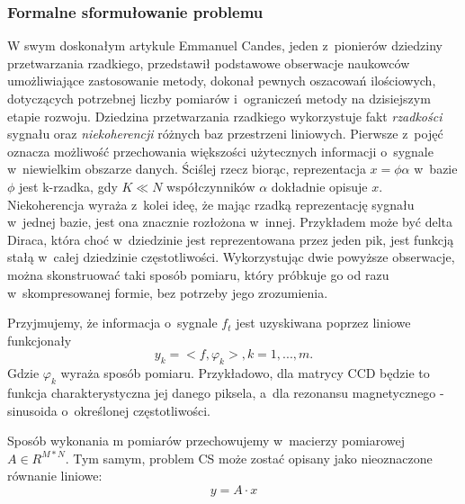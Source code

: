 \subsubsection{Formalne sformułowanie problemu}
W swym doskonałym artykule \cite{CandesIntro} Emmanuel Candes, jeden z~pionierów dziedziny przetwarzania rzadkiego, przedstawił podstawowe obserwacje naukowców umożliwiające zastosowanie metody, dokonał pewnych oszacowań ilościowych, dotyczących potrzebnej liczby pomiarów i~ograniczeń metody na dzisiejszym etapie rozwoju.
Dziedzina przetwarzania rzadkiego wykorzystuje fakt \textit{rzadkości} sygnału oraz \textit{niekoherencji} \cite{Candes2006} różnych baz przestrzeni liniowych. Pierwsze z~pojęć oznacza możliwość przechowania większości użytecznych informacji o~sygnale w~niewielkim obszarze danych. Ściślej rzecz biorąc, reprezentacja $x = \phi \alpha$ w~bazie $\phi$ jest k-rzadka, gdy $K \ll N$ współczynników $\alpha$ dokładnie opisuje $x$. Niekoherencja wyraża z~kolei ideę, że mając rzadką reprezentację sygnału w~jednej bazie, jest ona znacznie rozłożona w~innej. Przykładem może być delta Diraca, która choć w~dziedzinie jest reprezentowana przez jeden pik, jest funkcją stałą w~całej dziedzinie częstotliwości. Wykorzystując dwie powyższe obserwacje, można skonstruować taki sposób pomiaru, który próbkuje go od razu w~skompresowanej formie, bez potrzeby jego zrozumienia. 

Przyjmujemy, że informacja o~sygnale $f_t$ jest uzyskiwana poprzez liniowe funkcjonały
\begin{equation}
	y_k = <f, \varphi_k>, k = 1,...,m.
\end{equation}
Gdzie $\varphi_k$ wyraża sposób pomiaru. Przykładowo, dla matrycy CCD będzie to funkcja charakterystyczna jej danego piksela, a~dla rezonansu magnetycznego - sinusoida o~określonej częstotliwości.

Sposób wykonania m pomiarów przechowujemy w~macierzy pomiarowej $A \in R^{M*N}$. Tym samym, problem CS może zostać opisany jako nieoznaczone równanie liniowe: 
\begin{equation}
	y = A \cdot x
	\label{eq:lin}
\end{equation}

